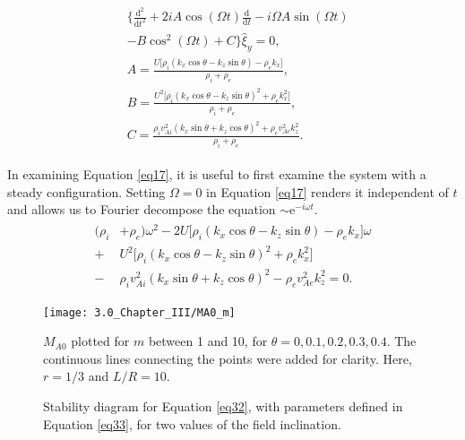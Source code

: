 \documentclass[12pt]{ociamthesis}
\begin{document}
\begin{align}
\begin{split}
\label{eq17}
& \bigg\{ \frac{\mathrm{d}^2}{\mathrm{d} t^2}
+ 2 i A \cos(\Omega t) \frac{\mathrm{d}}{\mathrm{d} t}
- i \Omega A \sin(\Omega t)
\\[0.3cm]
& - B \cos^2(\Omega t) 
+ C \bigg\} \hat \xi_y
= 0,
\\[0.3cm]
& A
= \frac{U \big[ \rho_i ( k_x \cos\theta - k_z \sin\theta ) 
- \rho_e k_x \big]}{\rho_i + \rho_e},
\\[0.3cm]
& B
= \frac{U^2 \big[ \rho_i \left( k_x \cos\theta
- k_z \sin\theta \right)^2
+ \rho_e k_x^2 \big]}{\rho_i + \rho_e},
\\[0.3cm]
& C
= \frac{\rho_i v_{A i}^2 \left( k_x \sin\theta
+ k_z \cos\theta \right)^2
+ \rho_e v_{A e}^2 k_z^2}{\rho_i + \rho_e}.
\end{split}
\end{align}

In examining Equation \eqref{eq17}, it is useful to first examine the system with a steady configuration.
Setting $\Omega = 0$ in Equation \eqref{eq17} renders it independent of $t$ and allows us to Fourier decompose the equation $\sim \mathrm{e}^{-i \omega t}$.
\begin{align}
\begin{split}
\label{eq18}
(\rho_i & + \rho_e) \omega^2
- 2 U \big[ \rho_i ( k_x \cos\theta - k_z \sin\theta ) 
- \rho_e k_x \big] \omega
\\[0.3cm]
+ & U^2 \big[ \rho_i \left( k_x \cos\theta
- k_z \sin\theta \right)^2
+ \rho_e k_x^2 \big]
\\[0.3cm]
- & \rho_i v_{A i}^2 \left( k_x \sin\theta
+ k_z \cos\theta \right)^2
- \rho_e v_{A e}^2 k_z^2
= 0.
\end{split}
\end{align}

\begin{figure}[t]
\centering
 \texttt{[image: 3.0\_Chapter\_III/MA0\_m]}
 \caption{$M_{A0}$ plotted for $m$ between 1 and 10, for $\theta=0, 0.1, 0.2, 0.3, 0.4$. The continuous lines connecting the points were added for clarity. Here, $r = 1/3$ and $L/R = 10$.}
 \label{MA0_m}
\end{figure}

\begin{figure*}[t]
\centering
{}
\hspace{3pt}
\caption{Stability diagram for Equation \eqref{eq32}, with parameters defined in Equation \eqref{eq33}, for two values of the field inclination.}
\label{stability_diagram_tilt}
\end{figure*}
\end{document}
